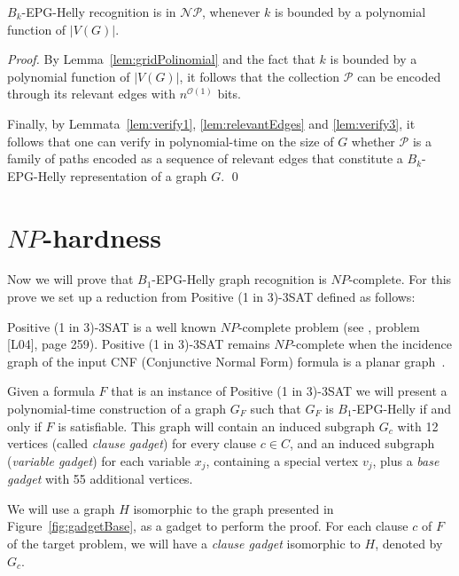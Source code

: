 \documentclass[runningheads]{llncs}
\begin{document}
\begin{theorem}\label{teo:nppertinencia}
{\sc $B_k$-EPG-Helly recognition} is in $\mathcal{NP}$, whenever $k$ is bounded by a polynomial function of $|V(G)|$.
\end{theorem}
\begin{proof}
By Lemma~\ref{lem:gridPolinomial} and the fact that $k$ is bounded by a polynomial function of $|V(G)|$, it follows that the collection $\mathcal{P}$ can be encoded through its relevant edges with $n^{\mathcal{O}(1)}$ bits.

Finally, by Lemmata~\ref{lem:verify1}, \ref{lem:relevantEdges} and \ref{lem:verify3}, it follows that one can verify in polynomial-time on the size of $G$ whether $\mathcal{P}$ is a family of paths encoded as a sequence of relevant edges that constitute a $B_k$-EPG-Helly representation of a graph $G$.
\qed
\end{proof}

\section{$NP$-hardness}\label{sec:sectionDispositivoClausula}

Now we will prove that  $B_1$-EPG-Helly graph recognition is $NP$-complete. For this prove we set up a reduction from {\sc Positive (1 in 3)-3SAT} defined  as follows:



{\sc Positive (1 in 3)-3SAT } is a well known $NP$-complete problem (see \cite{johnson1979}, problem [L04], page 259). {\sc Positive (1 in 3)-3SAT} remains $NP$-complete when the incidence graph of the input CNF (Conjunctive Normal Form) formula is a planar graph~\cite{mulzer2008minimum}.

Given a formula $F$ that is an instance of {\sc Positive (1 in 3)-3SAT} we will present a polynomial-time construction of a graph $ G_F$ such that $ G_F $ is $ B_1$-EPG-Helly if and only if $ F $ is satisfiable. This graph will contain an induced subgraph $ G_c$ with 12 vertices (called \emph {clause gadget}) for every clause $ c \in C $, and an induced subgraph (\emph {variable gadget}) for each variable $ x_j$, containing a special vertex  $ v_j$, plus a \emph{base gadget}  with 55 additional vertices.

We will use a graph $H$ isomorphic to the graph presented in Figure~\ref{fig:gadgetBase}, as a gadget to perform the proof. For each clause $c$ of $F$ of the target problem, we will have a \emph{clause gadget} isomorphic to $H$, denoted by $G_c$. %
\end{document}
